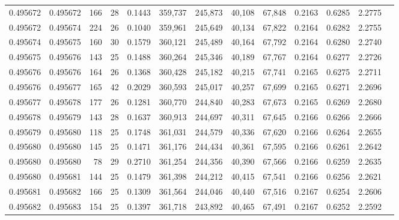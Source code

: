 \begin{tabular}{rrrrrrrrrrrrr}
0.495672 & 0.495672 & 166 &  28 &                                     0.1443 & 359,737 & 245,873 &  40,108 &  67,848 & 0.2163 & 0.6285 & 2.2775 \\
0.495672 & 0.495674 & 224 &  26 &                                     0.1040 & 359,961 & 245,649 &  40,134 &  67,822 & 0.2164 & 0.6282 & 2.2755 \\
0.495674 & 0.495675 & 160 &  30 &                                     0.1579 & 360,121 & 245,489 &  40,164 &  67,792 & 0.2164 & 0.6280 & 2.2740 \\
0.495675 & 0.495676 & 143 &  25 &                                     0.1488 & 360,264 & 245,346 &  40,189 &  67,767 & 0.2164 & 0.6277 & 2.2726 \\
0.495676 & 0.495676 & 164 &  26 &                                     0.1368 & 360,428 & 245,182 &  40,215 &  67,741 & 0.2165 & 0.6275 & 2.2711 \\
0.495676 & 0.495677 & 165 &  42 &                                     0.2029 & 360,593 & 245,017 &  40,257 &  67,699 & 0.2165 & 0.6271 & 2.2696 \\
0.495677 & 0.495678 & 177 &  26 &                                     0.1281 & 360,770 & 244,840 &  40,283 &  67,673 & 0.2165 & 0.6269 & 2.2680 \\
0.495678 & 0.495679 & 143 &  28 &                                     0.1637 & 360,913 & 244,697 &  40,311 &  67,645 & 0.2166 & 0.6266 & 2.2666 \\
0.495679 & 0.495680 & 118 &  25 &                                     0.1748 & 361,031 & 244,579 &  40,336 &  67,620 & 0.2166 & 0.6264 & 2.2655 \\
0.495680 & 0.495680 & 145 &  25 &                                     0.1471 & 361,176 & 244,434 &  40,361 &  67,595 & 0.2166 & 0.6261 & 2.2642 \\
0.495680 & 0.495680 &  78 &  29 &                                     0.2710 & 361,254 & 244,356 &  40,390 &  67,566 & 0.2166 & 0.6259 & 2.2635 \\
0.495680 & 0.495681 & 144 &  25 &                                     0.1479 & 361,398 & 244,212 &  40,415 &  67,541 & 0.2166 & 0.6256 & 2.2621 \\
0.495681 & 0.495682 & 166 &  25 &                                     0.1309 & 361,564 & 244,046 &  40,440 &  67,516 & 0.2167 & 0.6254 & 2.2606 \\
0.495682 & 0.495683 & 154 &  25 &                                     0.1397 & 361,718 & 243,892 &  40,465 &  67,491 & 0.2167 & 0.6252 & 2.2592 \\

\end{tabular}
